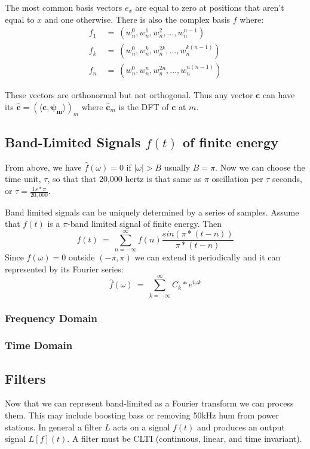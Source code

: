 \documentclass[a4paper]{article}
\begin{document}
The most common basis vectors $e_x$ are equal to zero at positions that aren't equal to $x$ and one otherwise. There is also the complex basis $f$ where:
\begin{align*}
	f_1\ &=\ (w_n^0, w_n^1, w_n^2, ..., w_n^{n-1}) \\
	f_k\ &=\ (w_n^0, w_n^k, w_n^{2k}, ..., w_n^{k(n-1)})\\
	f_n\ &=\ (w_n^0, w_n^n, w_n^{2n}, ..., w_n^{n(n-1)})
\end{align*}

These vectors are orthonormal but not orthogonal. Thus any vector $\mathbf{c}$ can have its $\mathbf{\hat{c}} = (\langle \mathbf{c, \psi_m}\rangle)_m$ where $\mathbf{\hat{c}}_m$ is the DFT of $\mathbf{c}$ at $m$.


\subsection{Band-Limited Signals \texorpdfstring{$f(t)$}{f(t)} of finite energy}
From above, we have $\hat{f}(\omega) = 0$ if $|\omega|>B$ usually $B = \pi$. Now we can choose the time unit, $\tau$, so that that 20,000 hertz is that same as $\pi$ oscillation per $\tau$ seconds, or $\tau = \frac{1s * \pi}{20,000}$.

Band limited signals can be uniquely determined by a series of samples. Assume that $f(t)$ is a $\pi$-band limited signal of finite energy. Then 
$$f(t)\ =\ \sum\limits_{n=-\infty}^{\infty}f(n)\frac{sin(\pi*(t-n))}{\pi*(t-n)}$$
Since $\hat{f}(\omega)=0$ outside $(-\pi,\pi)$ we can extend it periodically and it can represented by its Fourier series:
$$\hat{f}(\omega)\ =\ \sum\limits_{k=-\infty}^{\infty}C_k*e^{i\omega k}$$

\subsubsection{Frequency Domain}
\subsubsection{Time Domain}

\subsection{Filters}
Now that we can represent band-limited as a Fourier transform we can process them. This may include boosting bass or removing 50kHz hum from power stations. In general a filter $L$ acts on a signal $f(t)$ and produces an output signal $L[f](t)$. A filter must be CLTI (continuous, linear, and time invariant).
\end{document}
